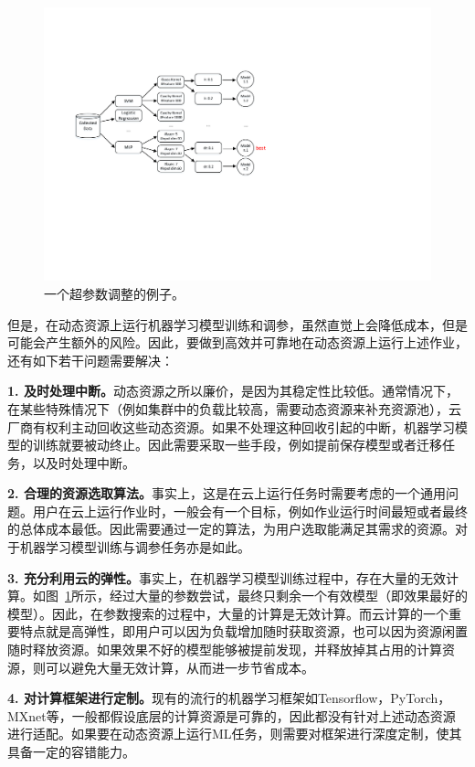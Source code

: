 \begin{figure}[h]
    \centerline{\includegraphics[width=\textwidth]{figures/hpt.pdf}}
    \caption{一个超参数调整的例子。}
    \label{hpt_example}
\end{figure}

但是，在动态资源上运行机器学习模型训练和调参，虽然直觉上会降低成本，但是可能会产生额外的风险。因此，要做到高效并可靠地在动态资源上运行上述作业，还有如下若干问题需要解决：

\textbf{1. 及时处理中断。}动态资源之所以廉价，是因为其稳定性比较低。通常情况下，在某些特殊情况下（例如集群中的负载比较高，需要动态资源来补充资源池），云厂商有权利主动回收这些动态资源。如果不处理这种回收引起的中断，机器学习模型的训练就要被动终止。因此需要采取一些手段，例如提前保存模型或者迁移任务，以及时处理中断。

\textbf{2. 合理的资源选取算法。}事实上，这是在云上运行任务时需要考虑的一个通用问题。用户在云上运行作业时，一般会有一个目标，例如作业运行时间最短或者最终的总体成本最低。因此需要通过一定的算法，为用户选取能满足其需求的资源。对于机器学习模型训练与调参任务亦是如此。

\textbf{3. 充分利用云的弹性。}事实上，在机器学习模型训练过程中，存在大量的无效计算。如图~\ref{hpt_example}所示，经过大量的参数尝试，最终只剩余一个有效模型（即效果最好的模型）。因此，在参数搜索的过程中，大量的计算是无效计算。而云计算的一个重要特点就是高弹性，即用户可以因为负载增加随时获取资源，也可以因为资源闲置随时释放资源。如果效果不好的模型能够被提前发现，并释放掉其占用的计算资源，则可以避免大量无效计算，从而进一步节省成本。

\textbf{4. 对计算框架进行定制。}现有的流行的机器学习框架如Tensorflow，PyTorch，MXnet等，一般都假设底层的计算资源是可靠的，因此都没有针对上述动态资源进行适配。如果要在动态资源上运行ML任务，则需要对框架进行深度定制，使其具备一定的容错能力。

